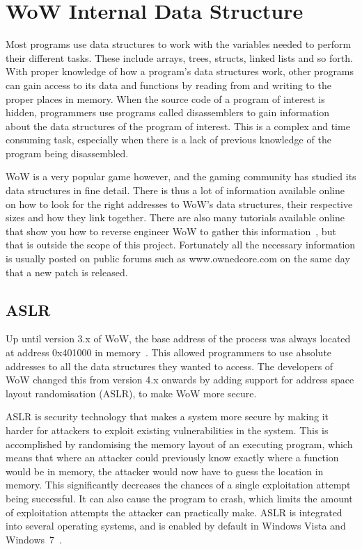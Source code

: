 

\section{WoW Internal Data Structure}
Most programs use data structures to work with the variables needed to perform their different tasks. These include arrays, trees, structs, linked lists and so forth. With proper knowledge of how a program's data structures work, other programs can gain access to its data and functions by reading from and writing to the proper places in memory. When the source code of a program of interest is hidden, programmers use programs called disassemblers to gain information about the data structures of the program of interest. This is a complex and time consuming task, especially when there is a lack of previous knowledge of the program being disassembled. 

WoW is a very popular game however, and the gaming community has studied its data structures in fine detail. There is thus a lot of information available online on how to look for the right addresses to WoW's data structures, their respective sizes and how they link together. %
There are also many tutorials available online that show you how to reverse engineer WoW to gather this information~\cite{idapro}, but that is outside the scope of this project. Fortunately all the necessary information is usually posted on public forums such as www.ownedcore.com on the same day that a new patch is released.

\subsection{ASLR} %

Up until version 3.x of WoW, the base address of the process was always located at address 0x401000 in memory~\cite{wowbase}. This allowed programmers to use absolute addresses to all the data structures they wanted to access. The developers of WoW changed this from version 4.x onwards by adding support for address space layout randomisation (ASLR), to make WoW more secure. 

ASLR is security technology that makes a system more secure by making it harder for attackers to exploit existing vulnerabilities in the system. This is accomplished by randomising the memory layout of an executing program, which means that where an attacker could previously know exactly where a function would be in memory, the attacker would now have to guess the location in memory. This significantly decreases the chances of a single exploitation attempt being successful. It can also cause the program to crash, which limits the amount of exploitation attempts the attacker can practically make. ASLR is integrated into several operating systems, and is enabled by default in Windows Vista and Windows~7~\cite{aslr}. 

